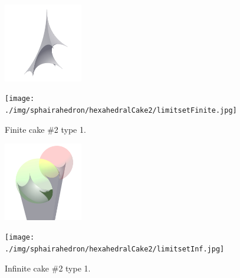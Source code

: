 \documentclass[suppldata, dvipdfmx]{interact}
\theoremstyle{plain}%
\theoremstyle{definition}
\theoremstyle{remark}
\theoremstyle{problemstyle}
\begin{document}
\begin{figure}[h!tbp]
 \begin{minipage}{0.5\textwidth}
  \begin{minipage}[t]{0.24\textwidth}
   \centering
   \includegraphics[width=1.35in, height=1.35in,
   keepaspectratio]{./img/sphairahedron/hexahedralCake2/sphairahedronFinite.jpg}
   \label{fig:cake2FiniteSphairahedron}
  \end{minipage}
  \hspace*{\fill}
  \begin{minipage}[t]{0.24\textwidth}
   \centering
   \texttt{[image: ./img/sphairahedron/hexahedralCake2/limitsetFinite.jpg]}
   \label{fig:cake2FiniteLimitset}
  \end{minipage}
  \hspace*{\fill}
  \caption{Finite cake \#2 type 1.}
  \label{fig:cakeFinite}
 \end{minipage}
 \hspace*{\fill}
 \begin{minipage}{0.5\textwidth}
  \begin{minipage}[t]{0.24\textwidth}
   \centering
   \includegraphics[width=1.35in, height=1.35in,
   keepaspectratio]{./img/sphairahedron/hexahedralCake2/sphairahedronInf.jpg}
   \label{fig:cake2InfSphairahedron}
  \end{minipage}
  \hspace*{\fill}
  \begin{minipage}[t]{0.24\textwidth}
   \centering
   \texttt{[image: ./img/sphairahedron/hexahedralCake2/limitsetInf.jpg]} 
   \label{fig:cake2InfLimitset}
  \end{minipage}
  \hspace*{\fill}
  \caption{Infinite cake \#2 type 1.}
  \label{fig:cakeInf}
 \end{minipage}
\end{figure}
\end{document}
